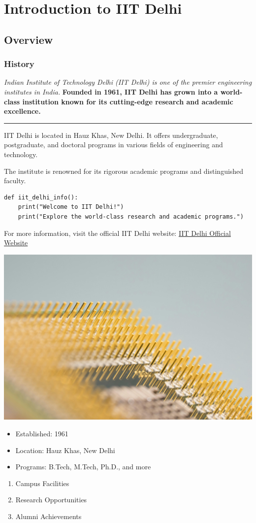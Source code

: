 

\section{Introduction to IIT Delhi}
\subsection{Overview}
\subsubsection{History}

\textit{Indian Institute of Technology Delhi (IIT Delhi) is one of the premier engineering institutes in India.}
\textbf{Founded in 1961, IIT Delhi has grown into a world-class institution known for its cutting-edge research and academic excellence.}

\hrule

IIT Delhi is located in Hauz Khas, New Delhi. It offers undergraduate, postgraduate, and doctoral programs in various fields of engineering and technology.\par
The institute is renowned for its rigorous academic programs and distinguished faculty.

\begin{verbatim}
def iit_delhi_info():
    print("Welcome to IIT Delhi!")
    print("Explore the world-class research and academic programs.")
\end{verbatim}

For more information, visit the official IIT Delhi website: \href{https://www.iitd.ac.in}{IIT Delhi Official Website}

\includegraphics{images/technology.jpg}

\begin{itemize}
    \item Established: 1961
    \item Location: Hauz Khas, New Delhi
    \item Programs: B.Tech, M.Tech, Ph.D., and more
\end{itemize}


\begin{enumerate}
    \item Campus Facilities
    \item Research Opportunities
    \item Alumni Achievements
\end{enumerate}

